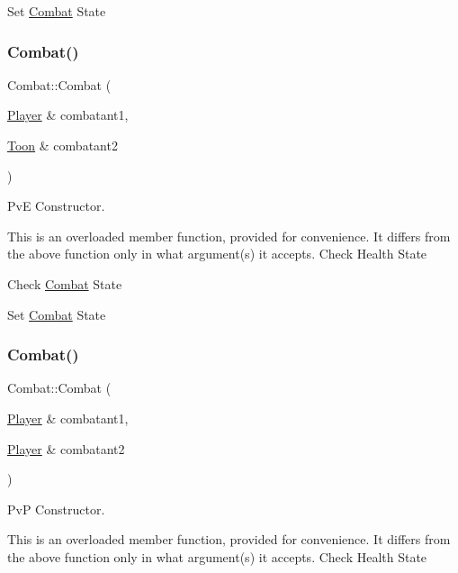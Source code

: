 Set \mbox{\hyperlink{classCombat}{Combat}} State \mbox{\label{classCombat_a53043f57b226ad771f55e55641d532e2}} 
\subsubsection{\texorpdfstring{Combat()}{Combat()}\hspace{0.1cm}{\footnotesize\ttfamily [3/4]}}
{\footnotesize\ttfamily Combat\+::\+Combat (\begin{DoxyParamCaption}\item[{\mbox{\hyperlink{classPlayer}{Player}} \&}]{combatant1,  }\item[{\mbox{\hyperlink{classToon}{Toon}} \&}]{combatant2 }\end{DoxyParamCaption})}



PvE Constructor. 

This is an overloaded member function, provided for convenience. It differs from the above function only in what argument(s) it accepts. Check Health State

Check \mbox{\hyperlink{classCombat}{Combat}} State

Set \mbox{\hyperlink{classCombat}{Combat}} State \mbox{\label{classCombat_adbb58cb73a7a85ab388cdecb9e15276c}} 
\subsubsection{\texorpdfstring{Combat()}{Combat()}\hspace{0.1cm}{\footnotesize\ttfamily [4/4]}}
{\footnotesize\ttfamily Combat\+::\+Combat (\begin{DoxyParamCaption}\item[{\mbox{\hyperlink{classPlayer}{Player}} \&}]{combatant1,  }\item[{\mbox{\hyperlink{classPlayer}{Player}} \&}]{combatant2 }\end{DoxyParamCaption})}



PvP Constructor. 

This is an overloaded member function, provided for convenience. It differs from the above function only in what argument(s) it accepts. Check Health State

